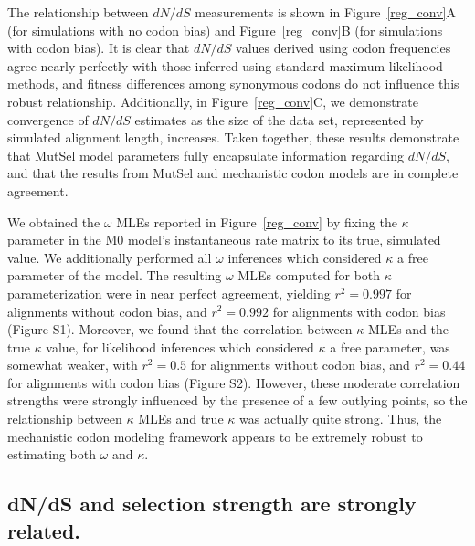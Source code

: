\documentclass{pnastwo}
\begin{document}
\begin{article}
The relationship between $dN/dS$ measurements is shown in Figure~\ref{reg_conv}A (for simulations with no codon bias) and Figure~\ref{reg_conv}B (for simulations with codon bias). It is clear that $dN/dS$ values derived using codon frequencies agree nearly perfectly with those inferred using standard maximum likelihood methods, and fitness differences among synonymous codons do not influence this robust relationship. Additionally, in Figure~\ref{reg_conv}C, we demonstrate convergence of $dN/dS$ estimates as the size of the data set, represented by simulated alignment length, increases. Taken together, these results demonstrate that MutSel model parameters fully encapsulate information regarding $dN/dS$, and that the results from MutSel and mechanistic codon models are in complete agreement.

We obtained the $\omega$ MLEs reported in Figure~\ref{reg_conv} by fixing the $\kappa$ parameter in the M0 model's instantaneous rate matrix to its true, simulated value. We additionally performed all $\omega$ inferences which considered $\kappa$ a free parameter of the model. The resulting $\omega$ MLEs computed for both $\kappa$ parameterization were in near perfect agreement, yielding $r^2=0.997$ for alignments without codon bias, and $r^2=0.992$ for alignments with codon bias (Figure S1). Moreover, we found that the correlation between $\kappa$ MLEs and the true $\kappa$ value, for likelihood inferences which considered $\kappa$ a free parameter, was somewhat weaker, with $r^2=0.5$ for alignments without codon bias, and $r^2=0.44$ for alignments with codon bias (Figure S2). However, these moderate correlation strengths were strongly influenced by the presence of a few outlying points, so the relationship between $\kappa$ MLEs and true $\kappa$ was actually quite strong. Thus, the mechanistic codon modeling framework appears to be extremely robust to estimating both $\omega$ and $\kappa$.  

\subsection*{dN/dS and selection strength are strongly related.}


\end{article}
\end{document}
